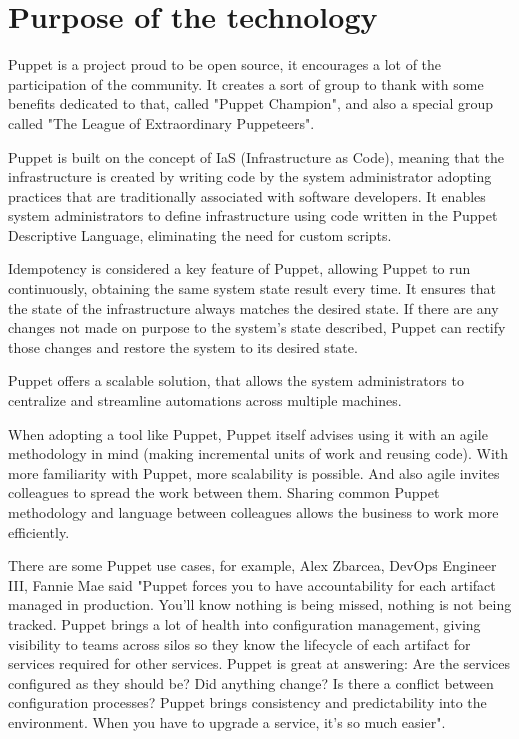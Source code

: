 \documentclass[12pt,a4paper,openright,twoside]{book}
\begin{document}
\section{Purpose of the technology}
Puppet is a project proud to be open source, it encourages a lot of the participation of the community.
It creates a sort of group to thank with some benefits dedicated to that, called "Puppet Champion", and also a special group called "The League of Extraordinary Puppeteers"\cite{puppetDocChampions}.


Puppet is built on the concept of IaS (Infrastructure as Code), meaning that the infrastructure is created by writing code by the system administrator adopting practices that are traditionally associated with software developers.
It enables system administrators to define infrastructure using code written in the Puppet Descriptive Language, eliminating the need for custom scripts.


Idempotency is considered a key feature of Puppet, allowing Puppet to run continuously, obtaining the same system state result every time.
It ensures that the state of the infrastructure always matches the desired state.
If there are any changes not made on purpose to the system's state described, Puppet can rectify those changes and restore the system to its desired state.


Puppet offers a scalable solution, that allows the system administrators to centralize and streamline automations across multiple machines.


When adopting a tool like Puppet, Puppet itself advises using it with an agile methodology in mind (making incremental units of work and reusing code).
With more familiarity with Puppet, more scalability is possible. And also agile invites colleagues to spread the work between them.
Sharing common Puppet methodology and language between colleagues allows the business to work more efficiently.
\cite{puppetIntroMedium}\cite{puppetDocIntro}


There are some Puppet use cases, for example, Alex Zbarcea, DevOps Engineer III, Fannie Mae said "Puppet forces you to have accountability for each artifact managed in production. You'll know nothing is being missed, nothing is not being tracked. Puppet brings a lot of health into configuration management, giving visibility to teams across silos so they know the lifecycle of each artifact for services required for other services. Puppet is great at answering: Are the services configured as they should be? Did anything change? Is there a conflict between configuration processes? Puppet brings consistency and predictability into the environment. When you have to upgrade a service, it's so much easier"\cite{puppetDocUseCase}.
\end{document}
